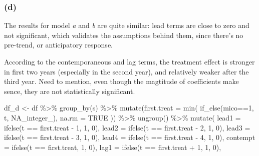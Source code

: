 \documentclass[
]{article}
\newenvironment{Shaded}{\begin{snugshade}}{\end{snugshade}}
\newcommand{\AttributeTok}[1]{\textcolor[rgb]{0.77,0.63,0.00}{#1}}
\newcommand{\ConstantTok}[1]{\textcolor[rgb]{0.00,0.00,0.00}{#1}}
\newcommand{\DecValTok}[1]{\textcolor[rgb]{0.00,0.00,0.81}{#1}}
\newcommand{\FunctionTok}[1]{\textcolor[rgb]{0.00,0.00,0.00}{#1}}
\newcommand{\NormalTok}[1]{#1}
\newcommand{\OtherTok}[1]{\textcolor[rgb]{0.56,0.35,0.01}{#1}}
\newcommand{\SpecialCharTok}[1]{\textcolor[rgb]{0.00,0.00,0.00}{#1}}
\begin{document}
\hypertarget{d-2}{%
\subsubsection{(d)}\label{d-2}}

The results for model \emph{a} and \emph{b} are quite similar: lead
terms are close to zero and not significant, which validates the
assumptions behind them, since there's no pre-trend, or anticipatory
response.

According to the contemporaneous and lag terms, the treatment effect is
stronger in first two years (especially in the second year), and
relatively weaker after the third year. Need to mention, even though the
magtitude of coefficients make sence, they are not statistically
significant.

\begin{Shaded}
\begin{Highlighting}[]
\NormalTok{df\_d }\OtherTok{\textless{}{-}}\NormalTok{ df }\SpecialCharTok{\%\textgreater{}\%} 
  \FunctionTok{group\_by}\NormalTok{(s) }\SpecialCharTok{\%\textgreater{}\%} 
  \FunctionTok{mutate}\NormalTok{(}\AttributeTok{first.treat =} \FunctionTok{min}\NormalTok{(}
    \FunctionTok{if\_else}\NormalTok{(mico}\SpecialCharTok{==}\DecValTok{1}\NormalTok{, t, }\ConstantTok{NA\_integer\_}\NormalTok{),}
    \AttributeTok{na.rm =} \ConstantTok{TRUE}
\NormalTok{  )) }\SpecialCharTok{\%\textgreater{}\%} 
  \FunctionTok{ungroup}\NormalTok{() }\SpecialCharTok{\%\textgreater{}\%}
  \FunctionTok{mutate}\NormalTok{(}
    \AttributeTok{lead1 =} \FunctionTok{ifelse}\NormalTok{(t }\SpecialCharTok{==}\NormalTok{ first.treat }\SpecialCharTok{{-}} \DecValTok{1}\NormalTok{, }\DecValTok{1}\NormalTok{, }\DecValTok{0}\NormalTok{),}
    \AttributeTok{lead2 =} \FunctionTok{ifelse}\NormalTok{(t }\SpecialCharTok{==}\NormalTok{ first.treat }\SpecialCharTok{{-}} \DecValTok{2}\NormalTok{, }\DecValTok{1}\NormalTok{, }\DecValTok{0}\NormalTok{),}
    \AttributeTok{lead3 =} \FunctionTok{ifelse}\NormalTok{(t }\SpecialCharTok{==}\NormalTok{ first.treat }\SpecialCharTok{{-}} \DecValTok{3}\NormalTok{, }\DecValTok{1}\NormalTok{, }\DecValTok{0}\NormalTok{),}
    \AttributeTok{lead4 =} \FunctionTok{ifelse}\NormalTok{(t }\SpecialCharTok{==}\NormalTok{ first.treat }\SpecialCharTok{{-}} \DecValTok{4}\NormalTok{, }\DecValTok{1}\NormalTok{, }\DecValTok{0}\NormalTok{),}
    \AttributeTok{contempt =} \FunctionTok{ifelse}\NormalTok{(t }\SpecialCharTok{==}\NormalTok{ first.treat, }\DecValTok{1}\NormalTok{, }\DecValTok{0}\NormalTok{),}
    \AttributeTok{lag1 =} \FunctionTok{ifelse}\NormalTok{(t }\SpecialCharTok{==}\NormalTok{ first.treat }\SpecialCharTok{+} \DecValTok{1}\NormalTok{, }\DecValTok{1}\NormalTok{, }\DecValTok{0}\NormalTok{),}

\end{Highlighting}
\end{Shaded}
\end{document}
